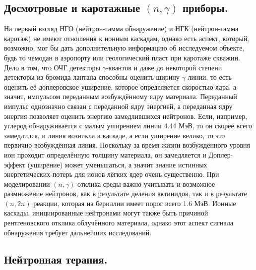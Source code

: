 \documentclass[a4paper,12pt]{article}
\begin{document}
\begin{large}
   
\subsection{Досмотровые и каротажные  $(n,\gamma)$ приборы.}
\label{subSol0}

	На первый взгляд НГО (нейтрон-гамма обнаружение) и НГК (нейтрон-гамма каротаж) не имеют отношения к ионным каскадам, однако есть аспект, который, возможно, мог бы дать дополнительную информацию об исследуемом объекте, будь то чемодан в аэропорту или геологический пласт при каротаже скважин.
	Дело в том, что  ОЧГ детекторы $\gamma$-квантов и даже до некоторой степени детекторы из бромида лантана способны оценить ширину $\gamma$-линии, то есть оценить её доплеровское уширение, которое определяется скоростью ядра, а значит, импульсом переданным возбуждённому ядру материала.
	Переданный импульс однозначно связан с переданной ядру энергией, а переданная ядру энергия позволяет оценить энергию замедлившихся нейтронов.
	Если, например, углерод обнаруживается с малым уширением линии 4.44 МэВ, то он скорее всего замедлился, и линия возникла в каскаде, а если уширение велико, то это первично возбуждённая линия.
	Поскольку за время жизни возбуждённого уровня ион проходит определённую толщину материала, он замедляется и Доплер-эффект (уширение) может уменьшаться, а значит знание истинных энергетических потерь для ионов лёгких ядер очень существенно.
	При моделировании $(n,\gamma)$ отклика среды важно учитывать и возможное размножение нейтронов, как в результате деления актинидов, так и в результате $(n,2n)$ реакции, которая на бериллии имеет порог всего 1.6 МэВ.
	Ионные каскады, инициированные нейтронами могут также быть причиной рентгеновского отклика облучённого материала, однако этот аспект сигнала обнаружения требует дальнейших исследований.

\subsection{Нейтронная терапия.}
\label{subSol1}


\end{large}
\end{document}
